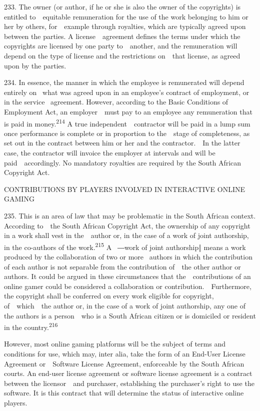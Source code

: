 \documentclass[
]{article}
\begin{document}
{233. }{The owner (or author, if he or she is also the owner of the
copyrights) is entitled to~~equitable remuneration for the use of the
work belonging to him or her by others, for~~example through royalties,
which are typically agreed upon between the parties. A
license~~agreement defines the terms under which the copyrights are
licensed by one party to~~another, and the remuneration will depend on
the type of license and the restrictions on~~that license, as agreed
upon by the parties.}

{234. }{In essence, the manner in which the employee is remunerated will
depend entirely on }{~what was agreed upon in an employee's contract of
employment, or in the service }{~agreement. However, according to the
}{Basic Conditions of Employment Act, }{an employer~~must pay to an
employee any remuneration that is paid in money.}\textsuperscript{{214
}}{A true independent~~contractor will be paid in a lump sum once
performance is complete or in proportion to the~~stage of completeness,
as set out in the contract between him or her and the contractor.~~In
the latter case, the contractor will invoice the employer at intervals
and will be paid~~accordingly. No mandatory royalties are required by
the South African }{Copyright Act}{.}

{CONTRIBUTIONS BY PLAYERS INVOLVED IN INTERACTIVE ONLINE GAMING}

{235. }{This is an area of law that may be problematic in the South
African context. According to~~the South African }{Copyright Act}{, the
ownership of any copyright in a work shall vest in the~~author or, in
the case of a work of joint authorship, in the }{co-authors }{of the
work.}\textsuperscript{{215 }}{A }{~―work of joint authorship‖ means a
work produced by the collaboration of two or more }{~authors in which
the contribution of each author is not separable from the contribution
of~~the other author or authors. It could be argued in these
circumstances that the~~contributions of an online gamer could be
considered a collaboration or contribution.~~Furthermore, the copyright
shall be conferred on every work eligible for copyright, of~~which~~the
author or, in the case of a work of joint authorship, any one of the
authors is a person~~who is a South African citizen or is domiciled or
resident in the country.}\textsuperscript{{216}}

{However, most online gaming platforms will be the subject of terms and
conditions for use, which may, }{inter alia, }{take the form of an
End-User License Agreement or~~Software License Agreement, enforceable
by the South African courts. An end-user license agreement or software
license agreement is a contract between the licensor~~and }{purchaser,
establishing the purchaser's right to use the software}{. It is this
contract that will determine the status of interactive online players.}
\end{document}
